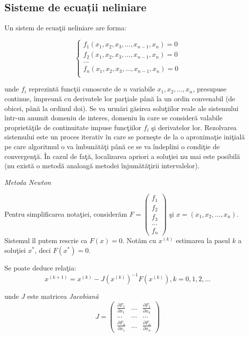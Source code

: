 \documentclass{exam}
\begin{document}
\subsection{Sisteme de ecuații neliniare}
Un sistem de ecuaţii neliniare are forma:

$$\left\{
	\begin{array}{lll}
		f_{1}(x_{1},x_{2},x_{3},...,x_{n-1},x_{n})=0 \\
		f_{2}(x_{1},x_{2},x_{3},...,x_{n-1},x_{n})=0 \\
		...                                          \\
		f_{n}(x_{1},x_{2},x_{3},...,x_{n-1},x_{n})=0 \\
	\end{array}
	\right.$$

\noindent  unde $f_{i}$ reprezintă funcţii cunoscute de $n$ variabile $x_{1}, x_{2}, ..., x_{n}$, presupuse continue, împreună cu derivatele lor parţiale până la un ordin convenabil (de obicei, până la ordinul doi). Se va urmări găsirea soluţiilor reale ale sistemului într-un anumit domeniu de interes, domeniu în care se consideră valabile proprietăţile de continuitate impuse funcţiilor $f_{i}$ şi derivatelor lor. Rezolvarea sistemului este un proces iterativ în care se porneşte de la o aproximaţie iniţială pe care algoritmul o va îmbunătăţi până ce se va îndeplini o condiţie de convergenţă. În cazul de faţă, localizarea apriori a soluţiei nu mai este posibilă (nu există o metodă analoagă metodei înjumătăţirii intervalelor).

\textit{Metoda Newton}

Pentru simplificarea notaţiei, considerăm $F=\left(\begin{array}{c}f_{1}\\f_{2}\\f_{3}\\...\\f_{n} \end{array}\right)$ şi $x=(x_{1},x_{2},...,x_{n})$. Sistemul îl putem rescrie ca $F(x)=0$.
Notăm cu $x^{(k)}$ estimarea la pasul $k$ a soluţiei $x^{*}$, deci $F(x^{*})=0$.

Se poate deduce relaţia:
$$x^{(k+1)} = x^{(k)} - J(x^{(k)})^{-1}F(x^{(k)}), k=0,1,2,... $$

\noindent  unde $J$ este matricea \textit{Jacobiană}
\[J=  \left( \begin{array}{ccc}
			\frac{\partial F_{1}}{ \partial x_{1}} & ...   & \frac{\partial F_{1}}{ \partial x_{n}} \\
			{...}                                  & {...} & {...}                                  \\
			\frac{\partial F_{n}}{ \partial x_{1}} & ...   & \frac{\partial F_{n}}{ \partial x_{n}}
		\end{array} \right)\]
\end{document}
